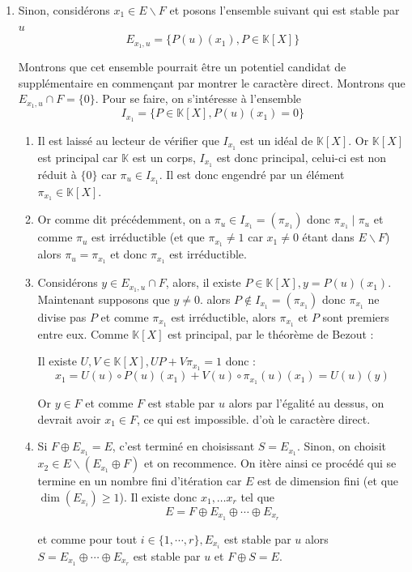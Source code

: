 \documentclass[answers,11pt]{exam}
\newcommand{\KK}{\mathbb{K}}
\begin{document}
\begin{questions}
\begin{solution}
\begin{enumerate}[label=(\alph*)]
    \item Sinon, considérons $x_1 \in E\backslash F$ et posons l'ensemble suivant qui est stable par $u$  \[ E_{x_1,u} = \{P(u)(x_1), P \in \KK[X]\} \]

    Montrons que cet ensemble pourrait être un potentiel candidat de supplémentaire en commençant par montrer le caractère direct. Montrons que $E_{x_1,u} \cap F = \{0\}$. Pour se faire, on s'intéresse à l'ensemble \[I_{x_1} = \{P\in \KK[X], P(u)(x_1)=0\}\] 
    \begin{enumerate}[label=\roman*)]
    \item Il est laissé au lecteur de vérifier que $I_{x_1}$ est un idéal de $\KK[X]$. Or $\KK[X]$ est principal car $\KK$ est un corps, $I_{x_1}$ est donc principal, celui-ci est non réduit à $\{0\}$ car $\pi_u \in I_{x_1}$. Il est donc engendré par un élément $\pi_{x_1} \in \KK[X]$. 
    \item Or comme dit précédemment, on a $\pi_u \in I_{x_1} = (\pi_{x_1})$  donc $\pi_{x_1} \mid \pi_u$ et comme $\pi_u$ est irréductible (et que $\pi_{x_1} \neq 1$ car $x_1 \neq 0 $ étant dans $E\backslash F$) alors $\pi_u = \pi_{x_1}$ et donc $\pi_{x_1}$ est irréductible.
    \item Considérons $y\in E_{x_1,u} \cap F$, alors, il existe $P \in \KK[X], y =P(u)(x_1)$. Maintenant supposons que $y\neq 0$. alors $P\not \in I_{x_1} =(\pi_{x_1})$ donc $\pi_{x_1}$ ne divise pas $P$ et comme $\pi_{x_1}$ est irréductible, alors $\pi_{x_1}$ et $P$ sont premiers entre eux. Comme $\KK[X]$ est principal, par le théorème de Bezout :

    Il existe $U,V \in \KK[X], UP + V\pi_{x_1} = 1$ donc : \[ x_1 = U(u) \circ P(u)(x_1) + V(u) \circ \pi_{x_1}(u)(x_1) = U(u)(y)\]

    Or $y \in F$ et comme $F$ est stable par $u$ alors par l'égalité au dessus, on devrait avoir $x_1 \in F$, ce qui est impossible. d'où le caractère direct.
    \item Si $F\oplus E_{x_1} = E$, c'est terminé en choisissant $S=E_{x_1}$. Sinon, on choisit $x_2 \in E\backslash (E_{x_1} \oplus F)$ et on recommence. On itère ainsi ce procédé qui se termine en un nombre fini d'itération car $E$ est de dimension fini (et que $\dim(E_{x_i}) \geq 1$). Il existe donc $x_1,\dots x_r$ tel que \[ E = F \oplus E_{x_1} \oplus \cdots \oplus E_{x_r} \]

    et comme pour tout $i \in \{1, \cdots, r\}, E_{x_i}$ est stable par $u$ alors $S=E_{x_1} \oplus \cdots \oplus E_{x_r}$ est stable par $u$ et $F\oplus S=E$.
    \end{enumerate} 
   \end{enumerate}
 \end{solution}
 

\end{questions}
\end{document}
